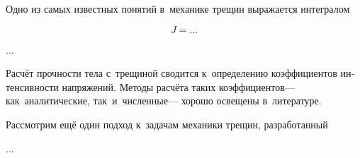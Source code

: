 






\begin{otherlanguage}{russian}

Одно из самых известных понятий в~механике трещин выражается интегралом

\nopagebreak\vspace{-0.2em}\begin{equation}
J = \ldots
\end{equation}

...



\end{otherlanguage}



\begin{otherlanguage}{russian}

Расчёт прочности тела с~трещиной сводится к~определению коэффициентов интенсивности напряжений. Методы расчёта таких коэффициентов\:--- как~аналитические, так~и~численные\:--- хорошо освещены в~литературе.

Рассмотрим ещё один подход к~задачам механики трещин, разработанный

...



\end{otherlanguage}

